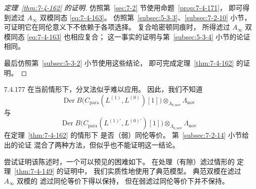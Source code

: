 \begin{proof}[定理~\ref{thm:7-4-162} 的证明]
仿照第~\ref{sec:7-2} 节使用命题~\ref{prop:7-4-171}，
即可得到滤过 $A_\infty$ 双模同态
\eqref{eq:7-4-163}。
仿照第~\ref{subsec:5-3-3}、\ref{subsec:7-2-10} 小节，
可证明它在同伦意义下不依赖于各项选择。
复合哈密顿同痕时，
所得滤过 $A_\infty$ 双模同态
\eqref{eq:7-4-163} 也相应复合；
这一事实的证明与第~\ref{subsec:5-3-4} 小节的论证相同。

最后仿照第~\ref{subsec:5-3-2} 小节使用这些结论，
即可完成定理~\ref{thm:7-4-162} 的证明。
\end{proof}

\begin{remark}{7.4.177}\label{rem:7-4-177}
在当前情形下，分叉法似乎难以应用。
因此，我们不知道
\[
\operatorname{Der}B
\bigl(C_{\mathrm{para}}(L^{(1)},L^{(0)})[1]\bigr)
\otimes_{\Lambda_{0,\mathrm{nov}}}\Lambda_{\mathrm{nov}}
\]
与
\[
\operatorname{Der}B
\bigl(C_{\mathrm{para}}(L^{(1)\prime},L^{(0)\prime})[1]\bigr)
\otimes_{\Lambda_{0,\mathrm{nov}}}\Lambda_{\mathrm{nov}}
\]
在定理~\ref{thm:7-4-162} 的情形下
是否（弱）同伦等价。
第~\ref{subsec:7-2-14} 小节给出的论证
混合了两种方法，但似乎也不能证明这一结论。

尝试证明该陈述时，一个可以预见的困难如下。
在处理（有隙）滤过情形的
定理~\ref{thm:7-4-149} 的证明中，
我们实质性地使用了典范模型。
典范双模在滤过 $A_\infty$ 双模的
滤过同伦等价下得以保持，
但在弱滤过同伦等价下并不保持。
\end{remark}
